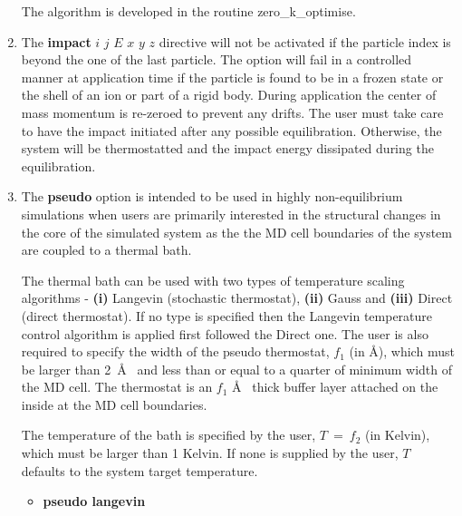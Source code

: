 \begin{enumerate}
The algorithm is developed in the \D routine {\sc zero\_k\_optimise}.

\item The {\bf impact} $i$ $j$ $E$ $x$ $y$ $z$ directive will
not be activated if the particle index is beyond the one of
the last particle.  The option will fail in a controlled manner
at application time if the particle is found to be in a frozen
state or the shell of an ion or part of a rigid body.  During
application the center of mass momentum is re-zeroed to prevent
any drifts.  The user must take care to have the impact
initiated after any possible equilibration.  Otherwise, the
system will be thermostatted and the impact energy dissipated
during the equilibration.

\item The {\bf pseudo} option is intended to be used in highly
non-equilibrium simulations when users are primarily interested in
the structural changes in the core of the simulated system as the
the MD cell boundaries of the system are coupled to a thermal bath.

The thermal bath can be used with two types of temperature scaling
algorithms - {\bf(i)} Langevin (stochastic thermostat), {\bf(ii)} Gauss
and {\bf(iii)} Direct (direct thermostat).  If no type is specified then
the Langevin temperature control algorithm is applied first followed the
Direct one.  The user is also required to specify the width of the
pseudo thermostat, $f_{1}$ (in \AA), which must be larger than 2~\AA~
and less than or equal to a quarter of minimum width of the MD cell.
The thermostat is an $f_{1}$ \AA~ thick buffer layer attached on the
inside at the MD cell boundaries.

The temperature of the bath is specified by the user, $T~=~f_{2}$
(in Kelvin), which must be larger than 1 Kelvin.  If none is supplied
by the user, $T$ defaults to the system target temperature.

\begin{itemize}
\item {\bf pseudo langevin}


\end{itemize}
\end{enumerate}
